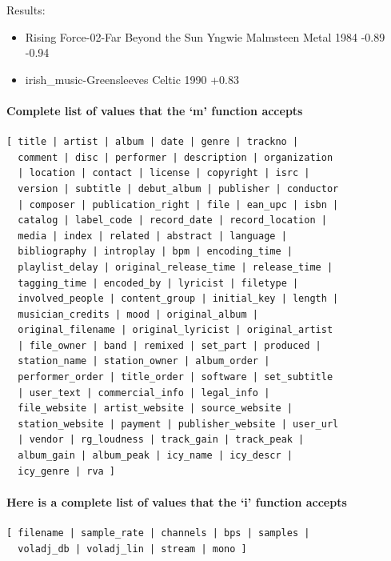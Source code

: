 \documentclass[10pt,english]{article}
\begin{document}
\noindent Results:


\begin{itemize}
\item Rising Force-02-Far Beyond the Sun  Yngwie Malmsteen  Metal         1984  -0.89 -0.94
\item irish\_music-Greensleeves                             Celtic         1990  +0.83      
\end{itemize}



\paragraph*{Complete list of values that the `m' function accepts}

\begin{verbatim}
[ title | artist | album | date | genre | trackno |
  comment | disc | performer | description | organization
  | location | contact | license | copyright | isrc |
  version | subtitle | debut_album | publisher | conductor
  | composer | publication_right | file | ean_upc | isbn |
  catalog | label_code | record_date | record_location |
  media | index | related | abstract | language |
  bibliography | introplay | bpm | encoding_time |
  playlist_delay | original_release_time | release_time |
  tagging_time | encoded_by | lyricist | filetype |
  involved_people | content_group | initial_key | length |
  musician_credits | mood | original_album |
  original_filename | original_lyricist | original_artist
  | file_owner | band | remixed | set_part | produced |
  station_name | station_owner | album_order |
  performer_order | title_order | software | set_subtitle
  | user_text | commercial_info | legal_info |
  file_website | artist_website | source_website |
  station_website | payment | publisher_website | user_url
  | vendor | rg_loudness | track_gain | track_peak |
  album_gain | album_peak | icy_name | icy_descr |
  icy_genre | rva ]
\end{verbatim}



\paragraph*{Here is a complete list of values that the `i' function accepts}

\begin{verbatim}
[ filename | sample_rate | channels | bps | samples |
  voladj_db | voladj_lin | stream | mono ]
\end{verbatim}
\end{document}
